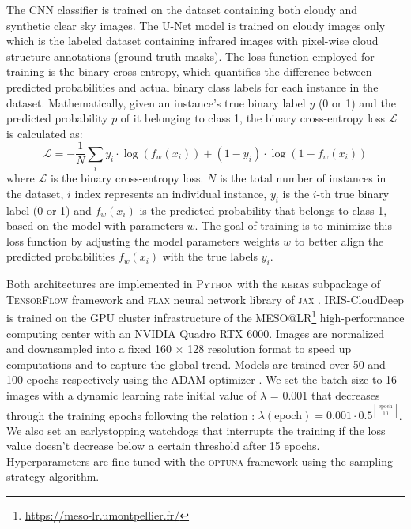 \documentclass[amt, article]{copernicus}
\begin{document}
The CNN classifier is trained on the dataset containing both cloudy and synthetic clear sky images. The U-Net model is trained on cloudy images only which is the labeled dataset containing infrared images with pixel-wise cloud structure annotations (ground-truth masks). The loss function employed for training is the binary cross-entropy, which quantifies the difference between predicted probabilities and actual binary class labels for each instance in the dataset. Mathematically, given an instance's true binary label $y$ (0 or 1) and the predicted probability $p$ of it belonging to class 1, the binary cross-entropy loss $\mathcal{L}$ is calculated as:
\begin{equation}
	\mathcal{L} = -\frac{1}{N}\sum_i y_i\cdot\log\left(f_w(x_i)\right) + (1-y_i)\cdot\log\left(1-f_w(x_i)\right)
\end{equation}
where $\mathcal{L}$ is the binary cross-entropy loss. $N$ is the total number of instances in the dataset, $i$ index represents an individual instance, $y_{i}$ is the $i$-th true binary label (0 or 1) and $f_w(x_i)$ is the predicted probability that belongs to class 1, based on the model with parameters $w$. The goal of training is to minimize this loss function by adjusting the model parameters weights $w$ to better align the predicted probabilities $f_w(x_i)$ with the true labels $y_{i}$.

Both architectures are implemented in \textsc{Python} with the \textsc{keras} \citep{Keras} subpackage of \textsc{TensorFlow} framework \citep{TensorFlow} and \textsc{flax} \citep{Flax} neural network library of \textsc{jax} \citep{Jax}. IRIS-CloudDeep is trained on the GPU cluster infrastructure of the MESO@LR\footnote{\url{https://meso-lr.umontpellier.fr/}} high-performance computing center with an NVIDIA Quadro RTX 6000. Images are normalized and downsampled into a fixed 160 $\times$ 128 resolution format to speed up computations and to capture the global trend. Models are trained over 50 and 100 epochs respectively using the ADAM optimizer \citep{ADAM}. We set the batch size to 16 images with a dynamic learning rate initial value of $\lambda$ = 0.001 that decreases through the training epochs following the relation : $\lambda(\text{epoch}) = 0.001 \cdot 0.5^{\left\lfloor \frac{\text{epoch}}{10} \right\rfloor}
$. We also set an earlystopping watchdogs that interrupts the training if the loss value doesn't decrease below a certain threshold after 15 epochs. Hyperparameters are fine tuned with the \textsc{optuna} framework \citep{Optuna} using the sampling strategy algorithm.
\end{document}

